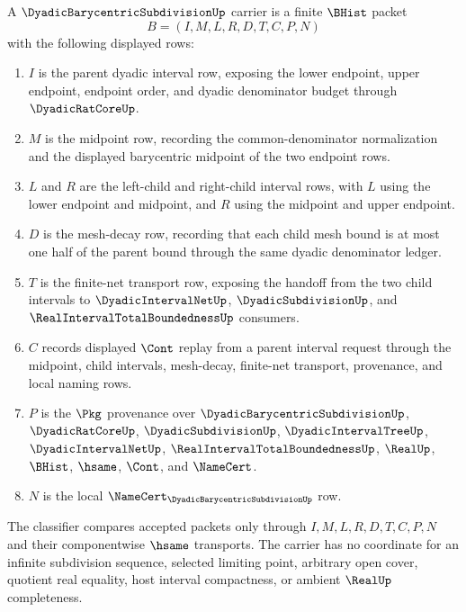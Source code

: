 \begin{definition}
\label{def:dyadic-barycentric-subdivision-carrier}
A $\DyadicBarycentricSubdivisionUp$ carrier is a finite $\BHist$ packet
$$
B=(I,M,L,R,D,T,C,P,N)
$$
with the following displayed rows:
\begin{enumerate}
\item $I$ is the parent dyadic interval row, exposing the lower endpoint, upper endpoint, endpoint order, and dyadic denominator budget through $\DyadicRatCoreUp$.
\item $M$ is the midpoint row, recording the common-denominator normalization and the displayed barycentric midpoint of the two endpoint rows.
\item $L$ and $R$ are the left-child and right-child interval rows, with $L$ using the lower endpoint and midpoint, and $R$ using the midpoint and upper endpoint.
\item $D$ is the mesh-decay row, recording that each child mesh bound is at most one half of the parent bound through the same dyadic denominator ledger.
\item $T$ is the finite-net transport row, exposing the handoff from the two child intervals to $\DyadicIntervalNetUp$, $\DyadicSubdivisionUp$, and $\RealIntervalTotalBoundednessUp$ consumers.
\item $C$ records displayed $\Cont$ replay from a parent interval request through the midpoint, child intervals, mesh-decay, finite-net transport, provenance, and local naming rows.
\item $P$ is the $\Pkg$ provenance over $\DyadicBarycentricSubdivisionUp$, $\DyadicRatCoreUp$, $\DyadicSubdivisionUp$, $\DyadicIntervalTreeUp$, $\DyadicIntervalNetUp$, $\RealIntervalTotalBoundednessUp$, $\RealUp$, $\BHist$, $\hsame$, $\Cont$, and $\NameCert$.
\item $N$ is the local $\NameCert_{\DyadicBarycentricSubdivisionUp}$ row.
\end{enumerate}
The classifier compares accepted packets only through $I,M,L,R,D,T,C,P,N$ and their componentwise $\hsame$ transports. The carrier has no coordinate for an infinite subdivision sequence, selected limiting point, arbitrary open cover, quotient real equality, host interval compactness, or ambient $\RealUp$ completeness.
\end{definition}

